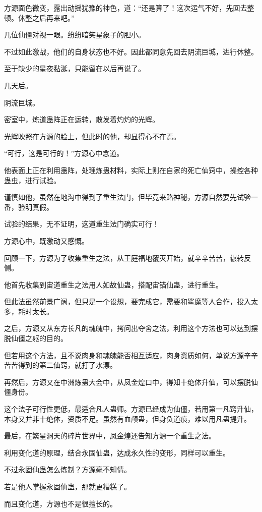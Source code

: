 \begin{this_body}
方源面色微变，露出动摇犹豫的神色，道：“还是算了！这次运气不好，先回去整顿。休整之后再来吧。”

几位仙僵对视一眼。纷纷暗笑星象子的胆小。

不过如此激战，他们的自身状态也不好。因此都同意先回去阴流巨城，进行休整。

至于缺少的星夜黏涎，只能留在以后再说了。

几天后。

阴流巨城。

密室中，炼道蛊阵正在运转，散发着灼灼的光辉。

光辉映照在方源的脸上，但此时的他，却显得心不在焉。

“可行，这是可行的！”方源心中念道。

他表面上正在利用蛊阵，处理炼蛊材料，实际上则在自家的死亡仙窍中，操控各种蛊虫，进行试验。

谨慎如他，虽然在地沟中得到了重生法门，但毕竟来路神秘，方源自然要先试验一番，验明真假。

试验的结果，无不证明，这道重生法门确实可行！

方源心中，既激动又感慨。

回顾一下，方源为了收集重生之法，从王庭福地覆灭开始，就辛辛苦苦，辗转反侧。

他首先收集到宙道重生之法用人如故仙蛊，搭配宙锚仙蛊，进行重生。

但此法虽然前景广阔，但只是一个设想，要完成它，需要和鲨魔等人合作，投入太多，耗时太长。

之后，方源又从东方长凡的魂魄中，拷问出夺舍之法，利用这个方法也可以达到摆脱仙僵之躯的目的。

但若用这个方法，且不说肉身和魂魄能否相互适应，肉身资质如何，单说方源辛辛苦苦得到的第二仙窍，就打了水漂。

再然后，方源又在中洲炼蛊大会中，从凤金煌口中，得知十绝体升仙，可以摆脱仙僵身份。

这个法子可行性更低，最适合凡人蛊师。方源已经成为仙僵，若用第一凡窍升仙，本身又并非十绝体，资质不足。虽然有血颅蛊，但身负道痕，难以用凡蛊提升。

最后，在繁星洞天的碎片世界中，凤金煌还告知方源一个重生之法。

利用变化道的原理，结合永固仙蛊，达成永久性的变形，同样可以重生。

不过永固仙蛊怎么炼制？方源毫不知情。

若是他人掌握永固仙蛊，那就更糟糕了。

而且变化道，方源也不是很擅长的。


\end{this_body}

